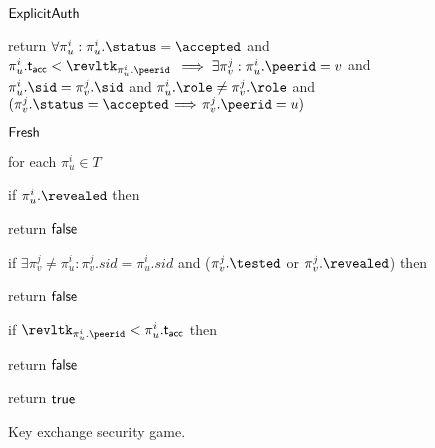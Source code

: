 \begin{figure}[tp]
\begin{minipage}[t]{0.49\textwidth}
		\begin{algorithm}{$\mathsf{ExplicitAuth}$}
			\item return \newline
			\null \hindent  $\forall \pi_u^i : \pi_u^i.\status = \accepted$ \newline 
			\null \hindent \hindent \hindent \hindent and $\pi_u^i.\taccepted < \revltk_{\pi_u^i.\peerid}$ \newline {} \newline
			\null\hindent \hindent  $\implies \exists \pi_v^j : \pi_u^i.\peerid = v$ \newline
			\null \hindent \hindent \hphantom{$\implies$} and $\pi_u^i.\sid = \pi_v^j.\sid$ \newline
			\null \hindent \hindent \hphantom{$\implies$} and $\pi_u^i.\role \neq \pi_v^j.\role$
			\newline 	{} \newline
			\null \hindent \hphantom{$\implies$} and $(\pi_v^j.\status = \accepted \!\implies\! \pi_v^j.\peerid = u)$
		\end{algorithm}
		
		\ExptSepSpace
		
		\begin{algorithm}{$\mathsf{Fresh}$}
			\item for each $\pi_u^i \in T$
			\item \hindent if $\pi_u^i.\revealed$ then
			\item \hindent \hindent return $\mathsf{false}$
			
			\item \hindent if $\exists \pi_v^j \neq \pi_u^i : \pi_v^j.sid = \pi_u^i.sid$ 
			\newline \null \hindent \hindent and ($\pi_v^j.\tested$ or $\pi_v^j.\revealed$) then
			\item \hindent \hindent return $\mathsf{false}$
			
			\item \hindent if $\revltk_{\pi_u^i.\peerid} < \pi_u^i.\taccepted$ then
			\item \hindent \hindent return $\mathsf{false}$
			
			\item return $\mathsf{true}$
		\end{algorithm}
	\end{minipage}
	
	\caption{%
		Key exchange security game.
	}
	\label{fig:AKE-security}
\end{figure}

